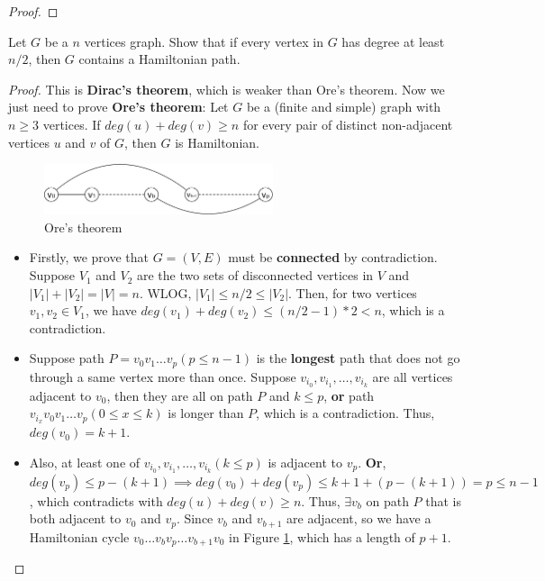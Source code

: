 \documentclass{article}
\newcounter{exercise}
\newcommand{\<}{
    \langle}
\renewcommand{\>}{
    \rangle}
\begin{document}
{\begin{proof}
\end{proof}


\newpage

\begin{exercise}
Let $G$ be a $n$ vertices graph. Show that if every vertex in $G$ has degree at least $n/2$, then $G$ contains a Hamiltonian path.
\end{exercise}
\begin{proof} This is \textbf{Dirac's theorem}, which is weaker than Ore's theorem. Now we just need to prove \textbf{Ore's theorem}: Let $G$ be a (finite and simple) graph with $n \geq 3$ vertices. If $deg(u)+deg(v) \geq n$ for every pair of distinct non-adjacent vertices $u$ and $v$ of $G$, then $G$ is Hamiltonian.
    
    \begin{figure}[!htp]
        \centering
        \includegraphics[width=0.6\textwidth]{img/3.pdf}
        \caption{Ore's theorem}
        \label{fig:sssss}
      \end{figure}
    \begin{itemize}
        \item Firstly, we prove that $G=(V,E)$ must be \textbf{connected} by contradiction. Suppose $V_1$ and $V_2$ are the two sets of disconnected vertices in $V$ and $|V_1|+|V_2|=|V|=n$. WLOG, $|V_1| \leq n/2 \leq |V_2|$. Then, for two vertices $v_1,v_2 \in V_1$, we have $deg(v_1)+deg(v_2) \leq (n/2-1)*2 < n$, which is a contradiction.
        
        \item Suppose path $P=v_0 v_1 \ldots v_p(p\leq n-1)$ is the \textbf{longest} path that does not go through a same vertex more than once. Suppose $v_{i_0},v_{i_1},\ldots,v_{i_k}$ are all vertices adjacent to $v_0$, then they are all on path $P$ and $k\leq p$, \textbf{or} path $v_{i_x}v_0v_1\ldots v_p(0\leq x\leq k)$ is longer than $P$, which is a contradiction. Thus, $deg(v_0)=k+1$.
        
        \item Also, at least one of $v_{i_0},v_{i_1},\ldots,v_{i_k} (k\leq p)$ is adjacent to $v_p$. \textbf{Or}, $deg(v_p)\leq p-(k+1)\implies deg(v_0)+deg(v_p)\leq k+1+(p-(k+1))=p\leq n-1$, which contradicts with $deg(u)+deg(v) \geq n$. Thus, $\exists v_b$ on path $P$ that is both adjacent to $v_0$ and $v_p$. Since $v_b$ and $v_{b+1}$ are adjacent, so we have a Hamiltonian cycle $v_0 \ldots v_b v_p \ldots  v_{b+1} v_0$ in Figure \ref{fig:sssss}, which has a length of $p+1$.
        

\end{itemize}
\end{proof}}
\end{document}
